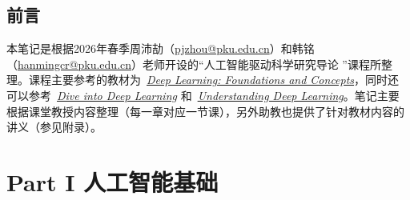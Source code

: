\documentclass[
	11pt, %
	a4paper, %
	oneside, %
]{LegrandOrangeBook}
\begin{document}


\pagestyle{empty} %

\tableofcontents %



\pagestyle{fancy} %

\cleardoublepage %


\chapterimage{} 
\chapterspaceabove{2.5cm}
\chapterspacebelow{2cm}

\chapter*{前言}

本笔记是根据2026年春季周沛劼（\href{pjzhou@pku.edu.cn}{pjzhou@pku.edu.cn}）和韩铭（\href{hanmingcr@pku.edu.cn}{hanmingcr@pku.edu.cn}）老师开设的``人工智能驱动科学研究导论 ''课程所整理。课程主要参考的教材为~\href{https://www.bishopbook.com}{\textit{Deep Learning: Foundations and Concepts}}，同时还可以参考~\href{https://d2l.ai/}{\textit{Dive into Deep Learning}} 和~\href{https://udlbook.github.io/udlbook/}{\textit{Understanding Deep Learning}}。笔记主要根据课堂教授内容整理（每一章对应一节课），另外助教也提供了针对教材内容的讲义（参见附录）。

\part{Part I 人工智能基础}

\chapterspaceabove{6.75cm} %
\chapterspacebelow{7.25cm} %
\end{document}
